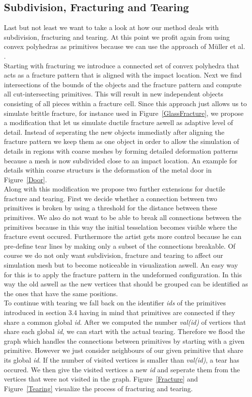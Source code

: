 \documentclass[
	11pt, 
	DIV10,
	a4paper, 
	oneside, 
	headings=normal, 
	captions=tableheading,
	final, 
	numbers=noenddot
]{scrartcl}
\begin{document}
\subsection{Subdivision, Fracturing and Tearing}
	Last but not least we want to take a look at how our method deals with subdivision, fracturing and tearing. At this point we profit again from using convex polyhedras as primitives because we can use the approach of Müller et al. \cite{15}.\\
	Starting with fracturing we introduce a connected set of convex polyhedra that acts as a fracture pattern that is aligned with the impact location. Next we find intersections of the bounds of the objects and the fracture pattern and compute all cut-intersecting primitives. This will result in new independent objects consisting of all pieces within a fracture cell. Since this approach just allows us to simulate brittle fracture, for instance used in Figure~\ref{GlassFracture}, we propose a modification that let us simulate ductile fracture aswell as adaptive level of detail. Instead of seperating the new objects immediatly after aligning the fracture pattern we keep them as one object in order to allow the simulation of details in regions with coarse meshes by forming detailed deformation patterns because a mesh is now subdivided close to an impact location. An example for details within coarse structurs is the deformation of the metal door in Figure~\ref{Door}.\\
	Along with this modification we propose two further extensions for ductile fracture and tearing. First we decide whether a connection between two primitives is broken by using a threshold for the distance between these primitives. We also do not want to be able to break all connections between the primitives because in this way the initial tesselation becomes visible where the fracture event occured. Furthermore the artist gets more control because he can pre-define tear lines by making only a subset of the connections breakable. Of course we do not only want subdivision, fracture and tearing to affect our simulation mesh but to become noticeable in visualization aswell. An easy way for this is to apply the fracture pattern in the undeformed configuration. In this way the old aswell as the new vertices that should be grouped can be identified as the ones that have the same positions. \\
	To continue with tearing we fall back on the identifier \textit{ids} of the primitives introduced in section 3.4 having in mind that primitives are connected if they share a common global \textit{id}. After we computed the number \textit{val(id)} of vertices that share each global \textit{id}, we can start with the actual tearing. Therefore we flood the graph which handles the connections between primitives by starting with a given primitive. However we just consider neighbours of our given primitive that share its global \textit{id}. If the number of visited vertices is smaller than \textit{val(id)}, a tear has occured. We then give the visited vertices a new \textit{id} and seperate them from the vertices that were not visited in the graph. Figure~\ref{Fracture} and Figure~\ref{Tearing} visualize the process of fracturing and tearing.\\
\end{document}
